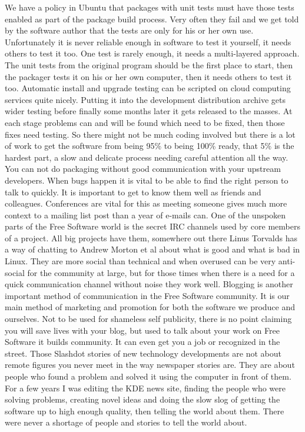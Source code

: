 We have a policy in Ubuntu that packages with unit tests must have those tests enabled as part of the package build process. Very often they fail and we get told by the software author that the tests are only for his or her own use. Unfortunately it is never reliable enough in software to test it yourself, it needs others to test it too. One test is rarely enough, it needs a multi-layered approach. The unit tests from the original program should be the first place to start, then the packager tests it on his or her own computer, then it needs others to test it too. Automatic install and upgrade testing can be scripted on cloud computing services quite nicely. Putting it into the development distribution archive gets wider testing before finally some months later it gets released to the masses. At each stage problems can and will be found which need to be fixed, then those fixes need testing. So there might not be much coding involved but there is a lot of work to get the software from being 95\% to being 100\% ready, that 5\% is the hardest part, a slow and delicate process needing careful attention all the way.
You can not do packaging without good communication with your upstream developers. When bugs happen it is vital to be able to find the right person to talk to quickly. It is important to get to know them well as friends and colleagues. Conferences are vital for this as meeting someone gives much more context to a mailing list post than a year of e-mails can. 
One of the unspoken parts of the Free Software world is the secret IRC channels used by core members of a project. All big projects have them, somewhere out there Linus Torvalds has a way of chatting to Andrew Morton et al about what is good and what is bad in Linux. They are more social than technical and when overused can be very anti-social for the community at large, but for those times when there is a need for a quick communication channel without noise they work well.
Blogging is another important method of communication in the Free Software community. It is our main method of marketing and promotion for both the software we produce and ourselves. Not to be used for shameless self publicity, there is no point claiming you will save lives with your blog, but used to talk about your work on Free Software it builds community. It can even get you a job or recognized in the street.
Those Slashdot stories of new technology developments are not about remote figures you never meet in the way newspaper stories are. They are about people who found a problem and solved it using the computer in front of them. For a few years I was editing the KDE news site, finding the people who were solving problems, creating novel ideas and doing the slow slog of getting the software up to high enough quality, then telling the world about them. There were never a shortage of people and stories to tell the world about. 
